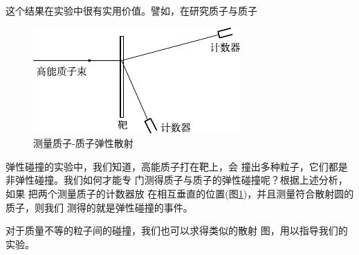 这个结果在实验中很有实用价值。譬如，在研究质子与质子
\begin{figure}
  \centering
  \includegraphics{figure/fig08.08}
  \caption{测量质子-质子弹性散射}
  \label{fig:08.08}
\end{figure}
弹性碰撞的实验中，我们知道，高能质子打在靶上，会
撞出多种粒子，它们都是非弹性碰撞。我们如何才能专
门测得质子与质子的弹性碰撞呢？根据上述分析，如果
把两个测量质子的计数器放
在相互垂直的位置(图\ref{fig:08.08})，并且测量符合散射圆的质子，则我们
测得的就是弹性碰撞的事件。

对于质量不等的粒子间的碰撞，我们也可以求得类似的散射
图，用以指导我们的实验。
